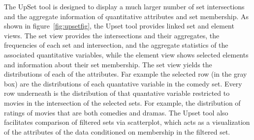 \documentclass[../main.tex]{subfiles}
\begin{document}
The UpSet tool is designed to display a much larger number of set intersections and the aggregate information of quantitative attributes and set membership. \cite{lex_upset:_2014} As shown in figure~\ref{fig:upsetfig}, the Upset tool provides linked set and element views. The set view provides the intersections and their
aggregates, the frequencies of each set and intersection, and the aggregate
statistics of the associated quantitative variables, while the element view shows
selected elements and information about their set membership. The set view yields the distributions of each of the attributes. Far example the selected row (in the gray box) are the distributions of each quantative variable in the comedy set. Every row underneath is the distribution of that quantative variable restricted to movies in the intersection of the selected sets. For example, the distribution of ratings of movies that are both comedies and dramas. The Upset tool
also facilitates comparison of filtered sets via scatterplot, which acts as a
visualization of the attributes of the data conditioned on membership in the
filtered set.  
\end{document}
